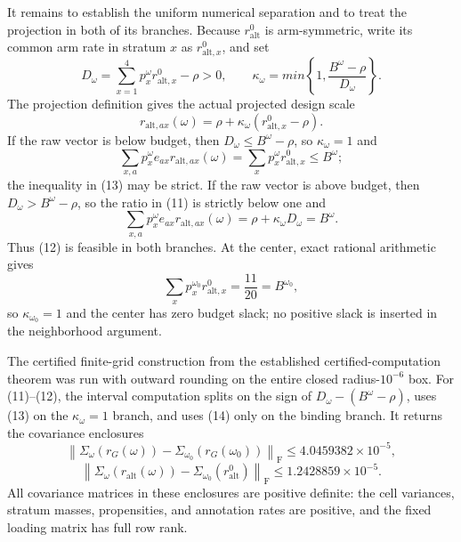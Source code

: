 It remains to establish the uniform numerical separation and to treat the projection in both of its branches.  Because \(r_{\mathrm{alt}}^0\) is arm-symmetric, write its common arm rate in stratum \(x\) as \(r_{\mathrm{alt},x}^0\), and set
\[
 D_\omega=\sum_{x=1}^4p_x^\omega r_{\mathrm{alt},x}^0-\rho>0,
 \qquad
 \kappa_\omega=min\left\{1,\frac{B^\omega-\rho}{D_\omega}\right\}.
 \tag{11}
\]
The projection definition gives the actual projected design scale
\[
 r_{\mathrm{alt},ax}(\omega)
 =\rho+\kappa_\omega(r_{\mathrm{alt},x}^0-\rho).
 \tag{12}
\]
If the raw vector is below budget, then \(D_\omega\leq B^\omega-\rho\), so \(\kappa_\omega=1\) and
\[
 \sum_{x,a}p_x^\omega e_{ax}r_{\mathrm{alt},ax}(\omega)
 =\sum_xp_x^\omega r_{\mathrm{alt},x}^0\leq B^\omega;
 \tag{13}
\]
the inequality in (13) may be strict.  If the raw vector is above budget, then \(D_\omega>B^\omega-\rho\), so the ratio in (11) is strictly below one and
\[
 \sum_{x,a}p_x^\omega e_{ax}r_{\mathrm{alt},ax}(\omega)
 =\rho+\kappa_\omega D_\omega=B^\omega.
 \tag{14}
\]
Thus (12) is feasible in both branches.  At the center, exact rational arithmetic gives
\[
 \sum_xp_x^{\omega_0}r_{\mathrm{alt},x}^0=\frac{11}{20}=B^{\omega_0},
\]
so \(\kappa_{\omega_0}=1\) and the center has zero budget slack; no positive slack is inserted in the neighborhood argument.

The certified finite-grid construction from the established certified-computation theorem was run with outward rounding on the entire closed radius-\(10^{-6}\) box.  For (11)--(12), the interval computation splits on the sign of \(D_\omega-(B^\omega-\rho)\), uses (13) on the \(\kappa_\omega=1\) branch, and uses (14) only on the binding branch.  It returns the covariance enclosures
\[
 \left\|\Sigma_\omega(r_G(\omega))
 -\Sigma_{\omega_0}(r_G(\omega_0))\right\|_{\mathrm F}
 \leq 4.0459382\times10^{-5},
 \tag{15}
\]
\[
 \left\|\Sigma_\omega(r_{\mathrm{alt}}(\omega))
 -\Sigma_{\omega_0}(r_{\mathrm{alt}}^0)\right\|_{\mathrm F}
 \leq 1.2428859\times10^{-5}.
 \tag{16}
\]
All covariance matrices in these enclosures are positive definite: the cell variances, stratum masses, propensities, and annotation rates are positive, and the fixed loading matrix has full row rank.

